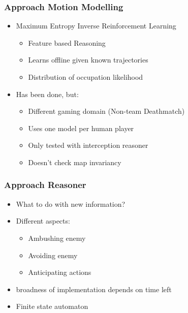 \documentclass{beamer}
\begin{document}
\begin{frame}
\frametitle{Approach Motion Modelling}
\begin{itemize}
    \item Maximum Entropy Inverse Reinforcement Learning
    \begin{itemize}
        \item Feature based Reasoning
        \item Learns offline given known trajectories
        \item Distribution of occupation likelihood
    \end{itemize}
    \item Has been done, but:
        \begin{itemize}
            \item Different gaming domain (Non-team Deathmatch)
            \item Uses one model per human player
            \item Only tested with interception reasoner
            \item Doesn't check map invariancy
        \end {itemize}
\end{itemize}
\end{frame}

\begin{frame}
\frametitle{Approach Reasoner}
\begin{itemize}
    \item What to do with new information?
    \item Different aspects:
    \begin{itemize}
        \item Ambushing enemy
        \item Avoiding enemy
        \item Anticipating actions
    \end{itemize}
    \item broadness of implementation depends on time left
    \item Finite state automaton
\end{itemize}
\end{frame}
\end{document}
